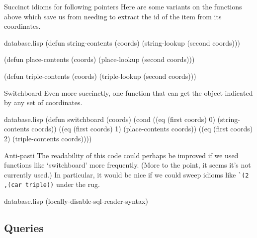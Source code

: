 \begin{notate}{Succinct idioms for following pointers}
Here are some variants on the functions above which save
us from needing to extract the id of the item from its
coordinates.
\end{notate}

\begin{common}{database.lisp}
(defun string-contents (coords)
  (string-lookup (second coords)))

(defun place-contents (coords)
  (place-lookup (second coords)))

(defun triple-contents (coords)
  (triple-lookup (second coords)))
\end{common}

\begin{notate}{Switchboard} \label{switchboard}
Even more succinctly, one function that can get
the object indicated by any set of coordinates.
\end{notate}

\begin{common}{database.lisp}
(defun switchboard (coords)
  (cond ((eq (first coords) 0)
         (string-contents coords))
        ((eq (first coords) 1)
         (place-contents coords))
        ((eq (first coords) 2)
         (triple-contents coords))))
\end{common}

\begin{notate}{Anti-pasti}
The readability of this code could perhaps be improved if
we used functions like `switchboard' more frequently.
(More to the point, it seems it's not currently used.)  In
particular, it would be nice if we could sweep idioms like
\verb+`(2 ,(car triple))+ under the rug.
\end{notate}

\begin{common}{database.lisp}
(locally-disable-sql-reader-syntax)
\end{common}

\subsection{Queries} \label{queries}

